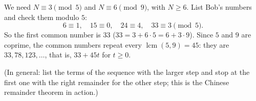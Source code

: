 We need $N\equiv3\pmod5$ and $N\equiv6\pmod9$, with $N\ge6$. List Bob's numbers and check them modulo $5$:
\[
6\equiv1,\quad 15\equiv0,\quad 24\equiv4,\quad 33\equiv3\pmod5 .
\]
So the first common number is $\boxed{33}$ ($33=3+6\cdot5=6+3\cdot9$). Since $5$ and $9$ are coprime, the common numbers repeat every $\operatorname{lcm}(5,9)=45$: they are $33, 78, 123, \dots$, that is, $33+45t$ for $t\ge0$.

(In general: list the terms of the sequence with the larger step and stop at the first one with the right remainder for the other step; this is the Chinese remainder theorem in action.)
